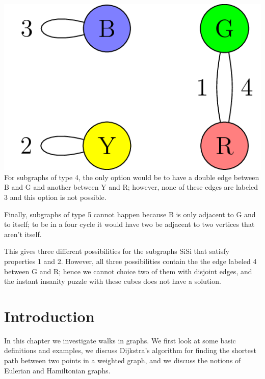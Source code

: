 \documentclass[10pt,]{book}
\theoremstyle{plain}
\theoremstyle{definition}
\theoremstyle{definition}
\theoremstyle{definition}
\begin{document}
\includegraphics[width=1\linewidth]{images/InstantInsanityImpossibleThird.png}
\hypertarget{p-69}{}%
For subgraphs of type 4, the only option would be to have a double edge between B and G and another between Y and R; however, none of these edges are labeled 3 and this option is not possible.%
\par
\hypertarget{p-70}{}%
Finally, subgraphs of type 5 cannot happen because B is only adjacent to G and to itself; to be in a four cycle it would have two be adjacent to two vertices that aren’t itself.%
\par
\hypertarget{p-71}{}%
This gives three different possibilities for the subgraphs SiSi that satisfy properties 1 and 2. However, all three possibilities contain the the edge labeled 4 between G and R; hence we cannot choice two of them with disjoint edges, and the instant insanity puzzle with these cubes does not have a solution.%
\typeout{************************************************}
\typeout{************************************************}
\chapter[{Introduction}]{Introduction}\label{ch_walks}
\hypertarget{p-72}{}%
In this chapter we investigate walks in graphs.  We first look at some basic definitions and examples, we discuss Dijkstra's algorithm for finding the shortest path between two points in a weighted graph, and we discuss the notions of Eulerian and Hamiltonian graphs.%
\typeout{************************************************}
\typeout{************************************************}
\end{document}
